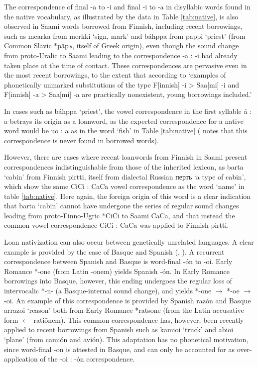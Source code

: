 \documentclass[svgnames,12pt]{scrartcl}
\newcommand{\ipa}[1]{{{\phon\mbox{#1}}}}
\begin{document}
{{The correspondence of final \ipa{-a} to \ipa{-i} and final \ipa{-i} to \ipa{-a} in disyllabic words found in the native vocabulary, as illustrated by the data in Table \ref{tab:native}, is also observed in Saami words borrowed from Finnish, including recent borrowings, such as \ipa{mearka} from \ipa{merkki} `sign, mark' and \ipa{báhppa} from \ipa{pappi} `priest' (from Common Slavic *\ipa{păpъ}, itself of Greek origin), even though the sound change from proto-Uralic to Saami leading to the correspondence \ipa{-a} : \ipa{-i} had already taken place at the time of contact. These correspondences are pervasive even in the most recent borrowings, to the extent that according to \citet[36]{aikio06nativization} `examples of phonetically unmarked substitutions of the type F[innish] \ipa{-i} > Saa[mi] \ipa{-i} and F[innish] \ipa{-a} > Saa[mi] \ipa{-a} are practically nonexistent, young borrowings included.'

In cases such as \ipa{báhppa} `priest', the vowel correspondence in the first syllable \ipa{á} : \ipa{a} betrays its origin as a loanword, as the expected correspondence for a native word would be \ipa{uo} : \ipa{a} as in the word `fish' in Table \ref{tab:native} (\citealt[35]{aikio06nativization} notes that this correspondence is never found in borrowed words).

However, there are cases where recent loanwords from Finnish in Saami present correspondences indistinguishable from those of the inherited lexicon, as \ipa{barta} `cabin' from Finnish \ipa{pirtti}, itself from dialectal Russian \ipa{перть} `a type of cabin', which show the same \ipa{CiCi} : \ipa{CaCa} vowel correspondence as the word `name' in table \ref{tab:native}. Here again, the foreign origin of this word is a clear indication that \ipa{barta} `cabin' cannot have undergone the series of regular sound changes leading from proto-Finno-Ugric *\ipa{CiCi} to Saami \ipa{CaCa}, and that instead the common vowel correspondence \ipa{CiCi} : \ipa{CaCa} was applied to Finnish \ipa{pirtti}.
 
Loan nativization can also occur between genetically unrelated languages. A clear example is provided by the case of Basque and Spanish (\citealt[53-54]{trask00chronology}, \citealt[21-3]{aikio06nativization}). 
A recurrent correspondence between Spanish and Basque is word-final \ipa{-ón} to \ipa{-oi}. Early Romance *\ipa{-one} (from Latin \ipa{-onem}) yields Spanish \ipa{-ón}. In Early Romance borrowings into Basque, however, this ending undergoes the regular loss of intervocalic *\ipa{-n-} (a Basque-internal sound change), and yields *\ipa{-one} $\rightarrow$ *\ipa{-oe} $\rightarrow$ \ipa{-oi}. An example of this correspondence is provided by Spanish \ipa{razón} and Basque \ipa{arrazoi} `reason' both from Early Romance *\ipa{ratsone} (from the Latin accusative form $\leftarrow$ \ipa{ratiōnem}).
This common correspondence has, however, been recently applied to recent borrowings from Spanish such as \ipa{kamioi} `truck' and \ipa{abioi} `plane' (from \ipa{camión} and \ipa{avión}). This adaptation has no phonetical motivation, since word-final \ipa{-on} is attested in Basque, and can only be accounted for as over-application of the \ipa{-oi} : \ipa{-ón} correspondence.
 
}}
\end{document}
